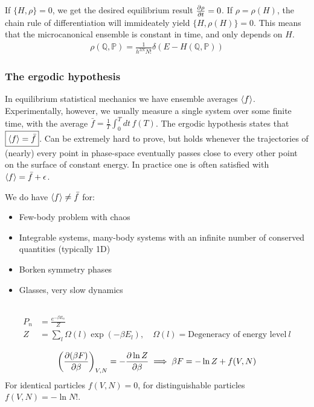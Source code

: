 \documentclass[a4paper, english, 12pt]{article}
\newcommand{\eps}{\epsilon}
\newcommand{\closed}[1]{\left( #1 \right)}
\newcommand{\curly}[1]{\{ #1 \} }
\newcommand{\Q}{\mathbb{Q}}
\renewcommand{\P}{\mathbb{P}}
\begin{document}
\begin{multicols*}{2}
If $\curly{H,\rho}=0$, we get the desired equilibrium result $\pdv{\rho}{t}=0$. If $\rho=\rho(H)$, the chain rule of differentiation will immideately yield $\curly{H,\rho(H)}=0$. This means that the microcanonical ensemble is constant in time, and only depends on $H$. 
\begin{align*}
    \rho(\Q,\P) = \frac{1}{h^{3N} N!} \delta\closed{E-H(\Q,\P)}
\end{align*}


\subsubsection*{\scriptsize The ergodic hypothesis}
In equilibrium statistical mechanics we have ensemble averages $\expval{f}$. Experimentally, however, we usually measure a single system over some finite time, with the average $\bar{f}=\frac{1}{T} \int_0^T dt\,f(T)$. The ergodic hypothesis states that $\boxed{\expval{f}=\bar{f}}$. Can be extremely hard to prove, but holds whenever the trajectories of (nearly) every point in phase-space eventually passes close to every other point on the surface of constant energy. In practice one is often satisfied with $\expval{f}=\bar{f}+\eps$. 

We do have $\expval{f}\neq\bar{f}$ for:
\begin{itemize}
    \item Few-body problem with chaos 
    \item Integrable systems, many-body systems with an infinite number of conserved quantities (typically 1D)
    \item Borken symmetry phases
    \item Glasses, very slow dynamics
\end{itemize} 


\subsection*{}

\begin{align*}
    P_n &= \frac{e^{-\beta E_n}}{Z} \\
    Z &= \sum_l \Omega(l)\exp(-\beta E_l),\quad \Omega(l)=\text{Degeneracy of energy level}\: l
\end{align*}


\begin{align*}
    \closed{\pdv{(\beta F)}{\beta}}_{V,N} = -\pdv{\ln Z}{\beta} \implies \beta F = -\ln Z + f(V,N)
\end{align*}
For identical particles $f(V,N)=0$, for distinguishable particles $f(V,N)=-\ln N!$. 


\end{multicols*}
\end{document}
